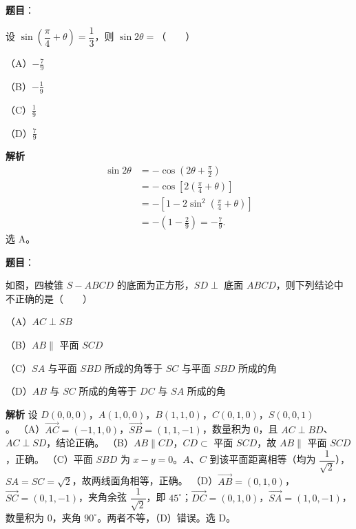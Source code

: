 \begin{answer}

\textbf{题目}：

设 $\sin\left(\dfrac\pi4+\theta\right)=\dfrac13$，则 $\sin2\theta=$\mbox{（　　）}

（A）$-\frac79$

（B）$-\frac19$

（C）$\frac19$

（D）$\frac79$

\textbf{解析}
\nopagebreak[4]
\[\begin{aligned}
\sin2\theta&=-\cos\left(2\theta+\frac\pi2\right)\\
&=-\cos\left[2\left(\frac\pi4+\theta\right)\right]\\
&=-\left[1-2\sin^2\left(\frac\pi4+\theta\right)\right]\\
&=-\left(1-\frac29\right)=-\frac79.
\end{aligned}\]
选 A。


\end{answer}
\begin{answer}

\textbf{题目}：

如图，四棱锥 $S-ABCD$ 的底面为正方形，$SD\perp$ 底面 $ABCD$，则下列结论中不正确的是\mbox{（　　）}

（A）$AC\perp SB$

（B）$AB\parallel$ 平面 $SCD$

（C）$SA$ 与平面 $SBD$ 所成的角等于 $SC$ 与平面 $SBD$ 所成的角

（D）$AB$ 与 $SC$ 所成的角等于 $DC$ 与 $SA$ 所成的角
\nopagebreak[4]
\begin{center}\end{center}
\nopagebreak[4]
\textbf{解析}
设 $D(0,0,0)$，$A(1,0,0)$，$B(1,1,0)$，$C(0,1,0)$，$S(0,0,1)$。
（A）$\overrightarrow{AC}=(-1,1,0)$，$\overrightarrow{SB}=(1,1,-1)$，数量积为 $0$，且 $AC\perp BD$、$AC\perp SD$，结论正确。
（B）$AB\parallel CD$，$CD\subset$ 平面 $SCD$，故 $AB\parallel$ 平面 $SCD$，正确。
（C）平面 $SBD$ 为 $x-y=0$。$A$、$C$ 到该平面距离相等（均为 $\dfrac1{\sqrt2}$），$SA=SC=\sqrt2$，故两线面角相等，正确。
（D）$\overrightarrow{AB}=(0,1,0)$，$\overrightarrow{SC}=(0,1,-1)$，夹角余弦 $\dfrac1{\sqrt2}$，即 $45^\circ$；$\overrightarrow{DC}=(0,1,0)$，$\overrightarrow{SA}=(1,0,-1)$，数量积为 $0$，夹角 $90^\circ$。两者不等，（D）错误。选 D。


\end{answer}
